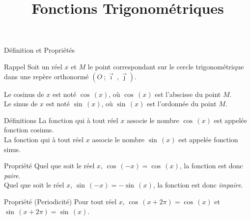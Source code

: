 \documentclass{cours}
\title{Fonctions Trigonométriques}
\begin{document}

    \begin{Gpartie}{Définition et Propriétés} 
        \begin{Spartie}{Rappel} 
            Soit un réel $x$ et $M$ le point correspondant sur le cercle trigonométrique dans une repère orthonormé $\left(O~;\vec{\imath}~,\vec{\jmath}\right)$.

            Le cosinus de $x$ est noté $\cos\,(x)$, où $\cos\,(x)$ est l'abscisse du point $M$. \\
            Le sinus de $x$ est noté $\sin\,(x)$, où $\sin\,(x)$ est l'ordonnée du point $M$.
            
            \begin{center}
                \parbox{\linewidth}{}
            \end{center}
        \end{Spartie}
        \begin{Spartie}{Définitions} 
            La fonction qui à tout réel $x$ associe le nombre $\cos\,(x)$ est appelée fonction cosinus. \\
            La fonction qui à tout réel $x$ associe le nombre $\sin\,(x)$ est appelée fonction sinus.
        \end{Spartie}
        \begin{Spartie}{Propriété} 
            Quel que soit le réel $x$, $\cos\,(-x)=\cos\,(x)$, la fonction est donc \emph{paire}. \\
            Quel que soit le réel $x$, $\sin\,(-x)=-\sin\,(x)$, la fonction est donc \emph{impaire}.
        \end{Spartie}
        \pagebreak
        \begin{Spartie}{Propriété (Periodicité)} 
            Pour tout réel $x$, $\cos\,(x+2\pi)=\cos\,(x)$ et $\sin\,(x+2\pi)=\sin\,(x)$.


\end{Spartie}
\end{Gpartie}
\end{document}

